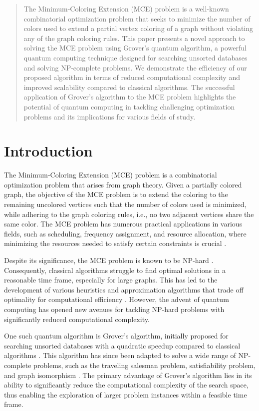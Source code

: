 \begin{abstract}
The Minimum-Coloring Extension (MCE) problem is a well-known combinatorial optimization problem that seeks to minimize the number of colors used to extend a partial vertex coloring of a graph without violating any of the graph coloring rules. This paper presents a novel approach to solving the MCE problem using Grover's quantum algorithm, a powerful quantum computing technique designed for searching unsorted databases and solving NP-complete problems. We demonstrate the efficiency of our proposed algorithm in terms of reduced computational complexity and improved scalability compared to classical algorithms. The successful application of Grover's algorithm to the MCE problem highlights the potential of quantum computing in tackling challenging optimization problems and its implications for various fields of study.
\end{abstract}

\section{Introduction}

The Minimum-Coloring Extension (MCE) problem is a combinatorial optimization problem that arises from graph theory. Given a partially colored graph, the objective of the MCE problem is to extend the coloring to the remaining uncolored vertices such that the number of colors used is minimized, while adhering to the graph coloring rules, i.e., no two adjacent vertices share the same color. The MCE problem has numerous practical applications in various fields, such as scheduling, frequency assignment, and resource allocation, where minimizing the resources needed to satisfy certain constraints is crucial \cite{application1, application2}.

Despite its significance, the MCE problem is known to be NP-hard \cite{nphard}. Consequently, classical algorithms struggle to find optimal solutions in a reasonable time frame, especially for large graphs. This has led to the development of various heuristics and approximation algorithms that trade off optimality for computational efficiency \cite{heuristic1, heuristic2}. However, the advent of quantum computing has opened new avenues for tackling NP-hard problems with significantly reduced computational complexity.

One such quantum algorithm is Grover's algorithm, initially proposed for searching unsorted databases with a quadratic speedup compared to classical algorithms \cite{grover}. This algorithm has since been adapted to solve a wide range of NP-complete problems, such as the traveling salesman problem, satisfiability problem, and graph isomorphism \cite{grovernp1, grovernp2, grovernp3}. The primary advantage of Grover's algorithm lies in its ability to significantly reduce the computational complexity of the search space, thus enabling the exploration of larger problem instances within a feasible time frame.

